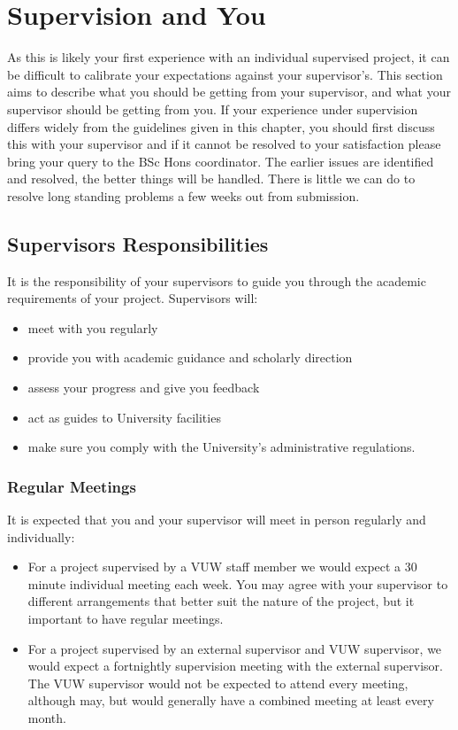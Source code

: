 \chapter{Supervision and You}


As this is likely your first experience with an individual supervised project, it
can be difficult to calibrate your expectations against your
supervisor's.  This section aims to describe what you
should be getting from your supervisor, and what your supervisor
should be getting from you.  If your experience under supervision differs widely from
the guidelines given in this chapter, you should first discuss this with
your supervisor and if it cannot be resolved to your satisfaction
please bring your query to the BSc Hons coordinator.  The earlier issues are
identified and resolved, the better things will be handled.  There is
little we can do to resolve long standing problems a few weeks out
from submission.

\section{Supervisors Responsibilities}

It is the responsibility of your supervisors to guide you through the
academic requirements of your project. Supervisors will:

\begin{itemize}
\item meet with you regularly
\item provide you with academic guidance and scholarly direction
\item assess your progress and give you feedback
\item act as guides to University facilities
\item make sure you comply with the University’s administrative regulations.
\end{itemize}

\subsection{Regular Meetings}

It is expected that you and your supervisor will meet in person
regularly and individually:

\begin{itemize}
\item For a project supervised by a VUW staff member we would expect 
a 30 minute individual meeting each week.  You may agree
with your supervisor to different arrangements that better suit the
nature of the project, but it important to have regular meetings.

\item For a project supervised by an external supervisor and VUW
supervisor, we would expect a fortnightly supervision meeting with the
external supervisor.  The VUW supervisor would not be expected to
attend every meeting, although may, but would generally have a combined meeting at
least every month.
\end{itemize}

